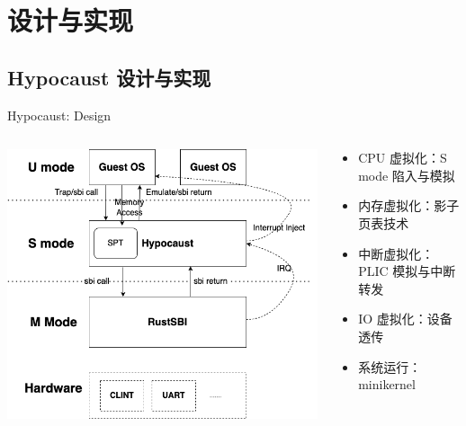 \documentclass{beamer}
\begin{document}
  \section{设计与实现}

  \subsection{Hypocaust 设计与实现}

  \begin{frame}{Hypocaust: Design}
  
    \begin{columns}
        \begin{column}{0.5\textwidth}
            \includegraphics[width=\linewidth]{pic/hypocaust-architecture.png}          
        \end{column}
        \begin{column}{0.5\textwidth}
            \begin{itemize}
                \item CPU 虚拟化：S mode 陷入与模拟
                \item 内存虚拟化：影子页表技术
                \item 中断虚拟化：PLIC 模拟与中断转发
                \item IO 虚拟化：设备透传
                \item 系统运行：minikernel
            \end{itemize}
        \end{column}
    \end{columns}
  \end{frame}
\end{document}
